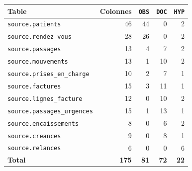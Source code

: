 
\begin{center}
\begin{tabular}{@{}lrrrr@{}}
\toprule
Table & Colonnes & \texttt{OBS} & \texttt{DOC} & \texttt{HYP} \\
\midrule
\texttt{source.patients} & 46 & 44 & 0 & 2 \\
\texttt{source.rendez\_vous} & 28 & 26 & 0 & 2 \\
\texttt{source.passages} & 13 & 4 & 7 & 2 \\
\texttt{source.mouvements} & 13 & 1 & 10 & 2 \\
\texttt{source.prises\_en\_charge} & 10 & 2 & 7 & 1 \\
\texttt{source.factures} & 15 & 3 & 11 & 1 \\
\texttt{source.lignes\_facture} & 12 & 0 & 10 & 2 \\
\texttt{source.passages\_urgences} & 15 & 1 & 13 & 1 \\
\texttt{source.encaissements} & 8 & 0 & 6 & 2 \\
\texttt{source.creances} & 9 & 0 & 8 & 1 \\
\texttt{source.relances} & 6 & 0 & 0 & 6 \\
\midrule
\textbf{Total} & \textbf{175} & \textbf{81} & \textbf{72} & \textbf{22} \\
\bottomrule
\end{tabular}
\end{center}
